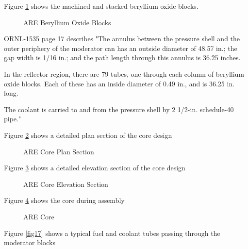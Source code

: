 \documentclass[ms,a4paper]{memoir}
\newcommand*{\msrarchive}{../../msr-archive}%
\begin{document}
Figure \ref{fig18} shows the machined and stacked beryllium oxide blocks.

\begin{figure}[H]
  \centering
  \caption{ARE Beryllium Oxide Blocks \parencite[Figure 3]{ornl-1294}}
  \label{fig18}
\end{figure}

ORNL-1535 page 17 describes "The annulus between the pressure shell and the outer periphery of the moderator can has an outside diameter of 48.57 in.; the gap width is 1/16 in.; and the path length through this annulus is 36.25 inches.

In the reflector region, there are 79 tubes, one through each column of beryllium oxide blocks. Each of these has an inside diameter of 0.49 in., and is 36.25 in. long.

The coolant is carried to and from the pressure shell by 2 1/2-in. schedule-40 pipe."

Figure \ref{fig19} shows a detailed plan section of the core design

\begin{figure}[H]
  \centering
  \caption{ARE Core Plan Section \parencite[Figure 10]{ornl-1234}}
  \label{fig19}
\end{figure}

Figure \ref{fig20} shows a detailed elevation section of the core design

\begin{figure}[H]
  \centering
  \caption{ARE Core Elevation Section \parencite[Figure 9]{ornl-1234}}
  \label{fig20}
\end{figure}

Figure \ref{fig15} shows the core during assembly

\begin{figure}[H]
  \centering
  \caption{ARE Core \parencite[Figure 13]{ornl-1868}}
  \label{fig15}
\end{figure}

Figure \ref{fig17} shows a typical fuel and coolant tubes passing through the moderator blocks
\end{document}
